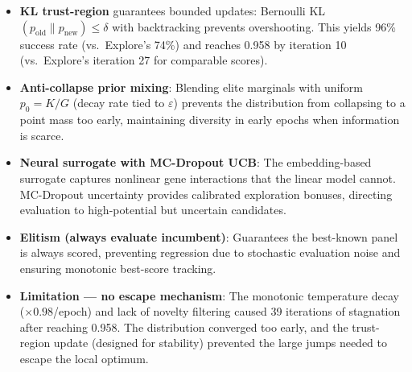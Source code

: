 \documentclass[8pt]{article}
\begin{document}
\begin{tcolorbox}[
    title={\textbf{Optimize Best}: Superior update stability $\to$ faster early convergence (0.958 by iter 10)},
    colback=lightcyan!15, colframe=addedB!60, fonttitle=\small\bfseries,
    boxrule=0.5pt, arc=2pt, left=6pt, right=6pt, top=3pt, bottom=3pt
]
\small
\begin{itemize}[leftmargin=1em, itemsep=2pt]
    \item \textbf{KL trust-region} guarantees bounded updates: Bernoulli KL$(p_\text{old} \| p_\text{new}) \leq \delta$ with backtracking prevents overshooting. This yields 96\% success rate (vs.\ Explore's 74\%) and reaches 0.958 by iteration 10 (vs.\ Explore's iteration 27 for comparable scores).

    \item \textbf{Anti-collapse prior mixing}: Blending elite marginals with uniform $p_0 = K/G$ (decay rate tied to $\varepsilon$) prevents the distribution from collapsing to a point mass too early, maintaining diversity in early epochs when information is scarce.

    \item \textbf{Neural surrogate with MC-Dropout UCB}: The embedding-based surrogate captures nonlinear gene interactions that the linear model cannot. MC-Dropout uncertainty provides calibrated exploration bonuses, directing evaluation to high-potential but uncertain candidates.

    \item \textbf{Elitism (always evaluate incumbent)}: Guarantees the best-known panel is always scored, preventing regression due to stochastic evaluation noise and ensuring monotonic best-score tracking.

    \item \textbf{Limitation --- no escape mechanism}: The monotonic temperature decay ($\times 0.98$/epoch) and lack of novelty filtering caused 39 iterations of stagnation after reaching 0.958. The distribution converged too early, and the trust-region update (designed for stability) prevented the large jumps needed to escape the local optimum.
\end{itemize}
\end{tcolorbox}
\end{document}
